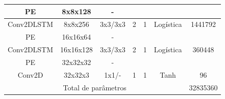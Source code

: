 \begin{table}[htbp]
\begin{adjustbox}{width=\columnwidth,center}
\begin{tabular}{|c|c|c|c|c|c|c|}
			PE             & 8x8x128                                                              & -                                                                                       &                &                        &                                                                       &                                                                         \\ \hline
			Conv2DLSTM      & 8x8x256                                                              & 3x3/3x3                                                                                 & 2              & 1                  & Logística                                                               & 1441792                                                                 \\ \hline
			PE             & 16x16x64                                                             & -                                                                                       &                &                        &                                                                       &                                                                         \\ \hline
			Conv2DLSTM      & 16x16x128                                                            & 3x3/3x3                                                                                 & 2              & 1                  & Logística                                                               & 360448                                                                  \\ \hline
			PE             & 32x32x32                                                             & -                                                                                       &                &                        &                                                                       &                                                                         \\ \hline
			Conv2D          & 32x32x3                                                              & 1x1/-                                                                                   & 1              & 1                  & Tanh                                                                  & 96                                                                      \\ \hline
			\multicolumn{6}{|c|}{Total de parâmetros}                                                                                                                                                                                                                                                          & 32835360                                                                \\ \hline
		\end{tabular}\quad
	\end{adjustbox}
	\label{table:aerc}
\end{table}
